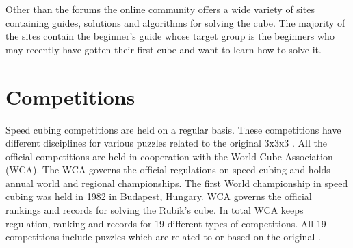 Other than the forums the online community offers a wide variety of sites containing guides, solutions and algorithms for solving the cube. The majority of the \rubik{} sites contain the beginner's guide\cite{jasminLee08} whose target group is the beginners who may recently have gotten their first cube and want to learn how to solve it. 

\section{Competitions}
\label{sec:wca}
Speed cubing competitions are held on a regular basis\cite{wca/competitions}. These competitions have different disciplines for various puzzles related to the original 3x3x3 \rubik{}. All the official competitions are held in cooperation with the World Cube Association (WCA). The WCA governs the official regulations on speed cubing and holds annual world and regional championships. The first World championship in speed cubing was held in 1982 in Budapest, Hungary. WCA governs the official rankings and records for solving the Rubik's cube. In total WCA keeps regulation, ranking and records for 19 different types of competitions. All 19 competitions include puzzles which are related to or based on the original \rubik{}. 
%